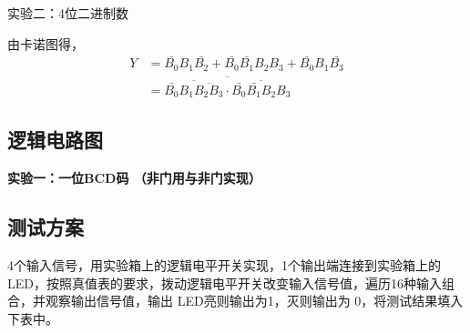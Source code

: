 \documentclass[a4paper,12pt]{article}
\begin{document}
实验二：4位二进制数

由卡诺图得，
\begin{align}
     Y&=\bar{B_0}B_1\bar{B_2}+\bar{B_0}\bar{B_1}B_2B_3+\bar{B_0}B_1\bar{B_3}\\
      &=\overline{\overline{\bar{B_0}B_1\overline{B_2B_3}}\cdot\overline{\bar{B_0}\bar{B_1}B_2B_3}}
\end{align}

\subsection{逻辑电路图}
\textbf{实验一：一位BCD码  （非门用与非门实现）}
\iffalse
\begin{figure}[h]
   \centering
   \texttt{[image: ./figures/lab2-1.png]}
   \caption{实验一逻辑电路图}
\end{figure}

\textbf{实验二：4位二进制数}
\begin{figure}[h]
   \centering
   \texttt{[image: ./figures/lab2-2.png]}
   \caption{实验二逻辑电路图}
\end{figure}

\fi
\subsection{测试方案}
4个输入信号，用实验箱上的逻辑电平开关实现，1个输出端连接到实验箱上的LED，按照真值表的要求，拨动逻辑电平开关改变输入信号值，遍历16种输入组合，并观察输出信号值，输出 LED亮则输出为1，灭则输出为 0，将测试结果填入下表中。
\end{document}
